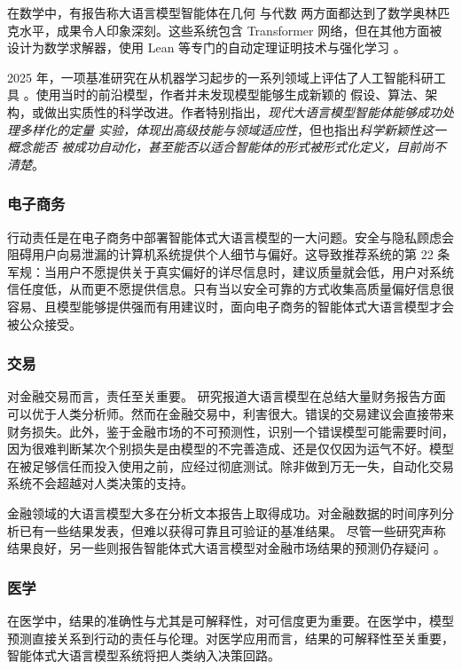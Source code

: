 在数学中，有报告称大语言模型智能体在几何 \citep{trinh2024solving} 与代数 \citep{hubert2025olympiad} 两方面都达到了数学奥林匹克水平，成果令人印象深刻。这些系统包含 Transformer 网络，但在其他方面被设计为数学求解器，使用 Lean \citep{de2015lean} 等专门的自动定理证明技术与强化学习 \citep{silver2017mastering,browne2012survey}。

2025 年，一项基准研究在从机器学习起步的一系列领域上评估了人工智能科研工具 \citep{nathani2025mlgym}。使用当时的前沿模型，作者并未发现模型能够生成新颖的
假设、算法、架构，或做出实质性的科学改进。作者特别指出，{\em 现代大语言模型智能体能够成功处理多样化的定量
实验，体现出高级技能与领域适应性}，但也指出{\em 科学新颖性这一概念能否
被成功自动化，甚至能否以适合智能体的形式被形式化定义，目前尚不清楚}。



\subsubsection{电子商务}
行动责任是在电子商务中部署智能体式大语言模型的一大问题。安全与隐私顾虑会阻碍用户向易泄漏的计算机系统提供个人细节与偏好。这导致推荐系统的第 22 条军规：当用户不愿提供关于真实偏好的详尽信息时，建议质量就会低，用户对系统信任度低，从而更不愿提供信息。只有当以安全可靠的方式收集高质量偏好信息很容易、且模型能够提供强而有用建议时，面向电子商务的智能体式大语言模型才会被公众接受。

\subsubsection{交易}
对金融交易而言，责任至关重要。
研究报道大语言模型在总结大量财务报告方面可以优于人类分析师。然而在金融交易中，利害很大。错误的交易建议会直接带来财务损失。此外，鉴于金融市场的不可预测性，识别一个错误模型可能需要时间，因为很难判断某次个别损失是由模型的不完善造成、还是仅仅因为运气不好。模型在被足够信任而投入使用之前，应经过彻底测试。除非做到万无一失，自动化交易系统不会超越对人类决策的支持。

金融领域的大语言模型大多在分析文本报告上取得成功。对金融数据的时间序列分析已有一些结果发表，但难以获得可靠且可验证的基准结果。
尽管一些研究声称结果良好，另一些则报告智能体式大语言模型对金融市场结果的预测仍存疑问 \citep{li2026can}。%

 


\subsubsection{医学}
在医学中，结果的准确性与尤其是可解释性，对可信度更为重要。在医学中，模型预测直接关系到行动的责任与伦理。对医学应用而言，结果的可解释性至关重要，智能体式大语言模型系统将把人类纳入决策回路。

